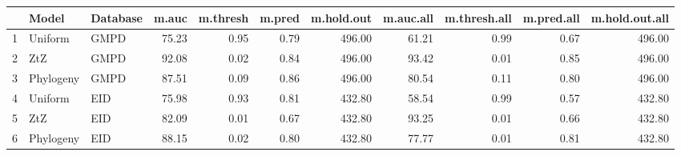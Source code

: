\begin{table}[ht]
\centering
\begin{tabular}{rllrrrrrrrr}
  \hline
 & Model & Database & m.auc & m.thresh & m.pred & m.hold.out & m.auc.all & m.thresh.all & m.pred.all & m.hold.out.all \\ 
  \hline
1 & Uniform & GMPD & 75.23 & 0.95 & 0.79 & 496.00 & 61.21 & 0.99 & 0.67 & 496.00 \\ 
  2 & ZtZ & GMPD & 92.08 & 0.02 & 0.84 & 496.00 & 93.42 & 0.01 & 0.85 & 496.00 \\ 
  3 & Phylogeny & GMPD & 87.51 & 0.09 & 0.86 & 496.00 & 80.54 & 0.11 & 0.80 & 496.00 \\ 
  4 & Uniform & EID & 75.98 & 0.93 & 0.81 & 432.80 & 58.54 & 0.99 & 0.57 & 432.80 \\ 
  5 & ZtZ & EID & 82.09 & 0.01 & 0.67 & 432.80 & 93.25 & 0.01 & 0.66 & 432.80 \\ 
  6 & Phylogeny & EID & 88.15 & 0.02 & 0.80 & 432.80 & 77.77 & 0.01 & 0.81 & 432.80 \\ 
   \hline
\end{tabular}
\end{table}
